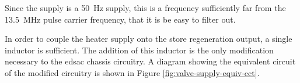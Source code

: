 Since the supply is a \SI{50}{\hertz} supply, this is a frequency sufficiently far from the \SI{13.5}{\mega\hertz} pulse carrier frequency, that it is be easy to filter out.

In order to couple the heater supply onto the store regeneration output, a single inductor is sufficient. The addition of this inductor is the only modification necessary to the \gls{edsac} chassis circuitry. A diagram showing the equivalent circuit of the modified circuitry is shown in Figure \ref{fig:valve-supply-equiv-cct}.

\begin{figure}[ht]
	\centering
\end{figure}
